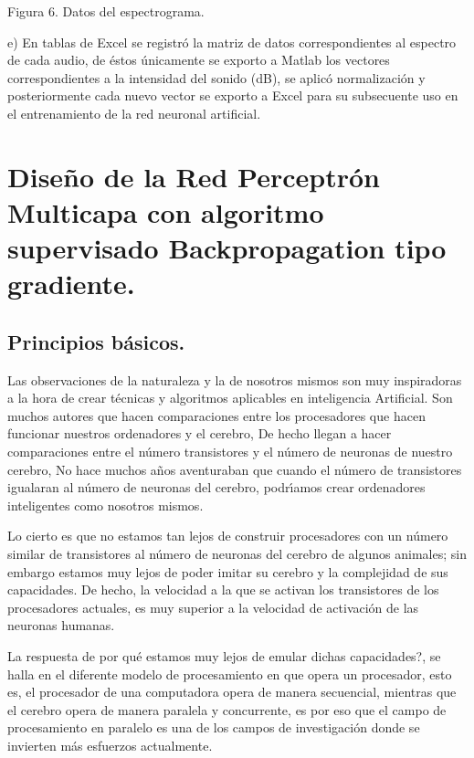 \begin{center}
Figura 6. Datos del espectrograma.
\end{center}

e) En tablas de Excel se registr\'{o} la matriz de datos correspondientes al
espectro de cada audio, de \'{e}stos \'{u}nicamente se exporto a Matlab los
vectores correspondientes a la intensidad del sonido (dB), se aplic\'{o}
normalizaci\'{o}n y posteriormente cada nuevo vector se exporto a Excel para
su subsecuente uso en el entrenamiento de la red neuronal artificial.

\section{Dise\~{n}o de la Red Perceptr\'{o}n Multicapa con algoritmo supervisado Backpropagation tipo gradiente.}

\subsection{Principios b\'{a}sicos.}

Las observaciones de la naturaleza y la de nosotros mismos son muy
inspiradoras a la hora de crear t\'{e}cnicas y algoritmos aplicables en
inteligencia Artificial. Son muchos autores que hacen comparaciones entre los
procesadores que hacen funcionar nuestros ordenadores y el cerebro, De hecho
llegan a hacer comparaciones entre el n\'{u}mero transistores y el n\'{u}mero
de neuronas de nuestro cerebro, No hace muchos a\~{n}os aventuraban que cuando
el n\'{u}mero de transistores igualaran al n\'{u}mero de neuronas del cerebro,
podr\'{\i}amos crear ordenadores inteligentes como nosotros mismos.

Lo cierto es que no estamos tan lejos de construir procesadores con un
n\'{u}mero similar de transistores al n\'{u}mero de neuronas del cerebro de
algunos animales; sin embargo estamos muy lejos de poder imitar su cerebro y
la complejidad de sus capacidades. De hecho, la velocidad a la que se activan
los transistores de los procesadores actuales, es muy superior a la velocidad
de activaci\'{o}n de las neuronas humanas.

La respuesta de \textquestiondown por qu\'{e} estamos muy lejos de emular
dichas capacidades?, se halla en el diferente modelo de procesamiento en que
opera un procesador, esto es, el procesador de una computadora opera de manera
secuencial, mientras que el cerebro opera de manera paralela y concurrente, es
por eso que el campo de procesamiento en paralelo es una de los campos de
investigaci\'{o}n donde se invierten m\'{a}s esfuerzos actualmente.

